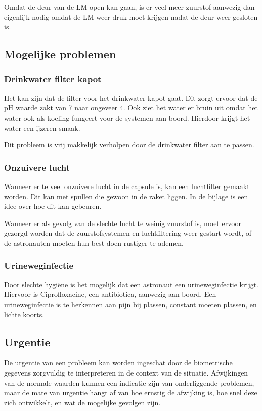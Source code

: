 Omdat de deur van de LM open kan gaan, is er veel meer zuurstof aanwezig dan eigenlijk nodig omdat de LM weer druk moet krijgen nadat de deur weer gesloten is.


\subsection{Mogelijke problemen}

\subsubsection{Drinkwater filter kapot}
Het kan zijn dat de filter voor het drinkwater kapot gaat. Dit zorgt ervoor dat de pH waarde zakt van 7 naar ongeveer 4. Ook ziet het water er bruin uit omdat het water ook als koeling fungeert voor de systemen aan boord. Hierdoor krijgt het water een ijzeren smaak.

Dit probleem is vrij makkelijk verholpen door de drinkwater filter aan te passen.

\subsubsection{Onzuivere lucht}
Wanneer er te veel onzuivere lucht in de capsule is, kan een luchtfilter gemaakt worden. Dit kan met spullen die gewoon in de raket liggen. In de bijlage is een idee over hoe dit kan gebeuren.

Wanneer er als gevolg van de slechte lucht te weinig zuurstof is, moet ervoor gezorgd worden dat de zuurstofsystemen en luchtfiltering weer gestart wordt, of de astronauten moeten hun best doen 
rustiger te ademen.

\subsubsection{Urineweginfectie}
Door slechte hygiëne is het mogelijk dat een astronaut een urineweginfectie krijgt. Hiervoor is Ciprofloxacine, een antibiotica, aanwezig aan boord. Een urineweginfectie is te herkennen aan pijn bij plassen, constant moeten plassen, en lichte koorts.


\subsection{Urgentie}
De urgentie van een probleem kan worden ingeschat door de biometrische gegevens zorgvuldig te interpreteren in de context van de situatie. Afwijkingen van de normale waarden kunnen een indicatie zijn van onderliggende problemen, maar de mate van urgentie hangt af van hoe ernstig de afwijking is, hoe snel deze zich ontwikkelt, en wat de mogelijke gevolgen zijn.

